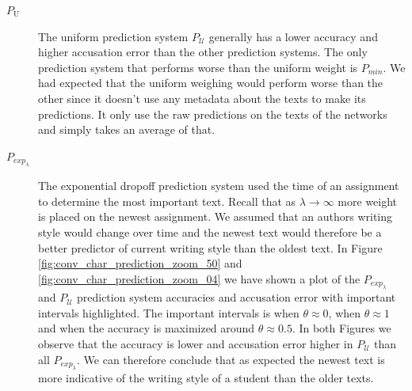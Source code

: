 \begin{description}

    \item[$P_\mathrm{U}$]

        The uniform prediction system $P_\mathcal{U}$ generally has a lower
        accuracy and higher accusation error than the other prediction systems.
        The only prediction system that performs worse than the uniform weight
        is $P_{min}$. We had expected that the uniform weighing would perform
        worse than the other since it doesn't use any metadata about the texts
        to make its predictions. It only use the raw predictions on the texts of
        the networks and simply takes an average of that.

    \item[$P_{exp_\lambda}$]

        The exponential dropoff prediction system used the time of an
        assignment to determine the most important text. Recall that
        as $\lambda \rightarrow \infty$ more weight is placed on the
        newest assignment. We assumed that an authors writing style
        would change over time and the newest text would therefore be
        a better predictor of current writing style than the oldest
        text. In Figure \ref{fig:conv_char_prediction_zoom_50} and
        \ref{fig:conv_char_prediction_zoom_04} we have shown a plot of the
        $P_{exp_\lambda}$ and $P_\mathcal{U}$ prediction system accuracies and
        accusation error with important intervals highlighted. The important
        intervals is when $\theta \approx 0$, when $\theta \approx 1$ and when
        the accuracy is maximized around $\theta \approx 0.5$. In both Figures
        we observe that the accuracy is lower and accusation error higher in
        $P_\mathcal{U}$ than all $P_{exp_\lambda}$. We can therefore conclude
        that as expected the newest text is more indicative of the writing style
        of a student than the older texts.


\end{description}
